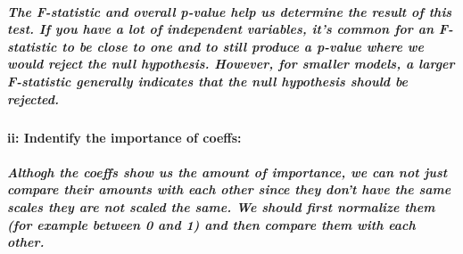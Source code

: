 \documentclass[
]{article}
\begin{document}
\hypertarget{the-f-statistic-and-overall-p-value-help-us-determine-the-result-of-this-test.-if-you-have-a-lot-of-independent-variables-its-common-for-an-f-statistic-to-be-close-to-one-and-to-still-produce-a-p-value-where-we-would-reject-the-null-hypothesis.-however-for-smaller-models-a-larger-f-statistic-generally-indicates-that-the-null-hypothesis-should-be-rejected.}{%
\subparagraph{The F-statistic and overall p-value help us determine the
result of this test. If you have a lot of independent variables, it's
common for an F-statistic to be close to one and to still produce a
p-value where we would reject the null hypothesis. However, for smaller
models, a larger F-statistic generally indicates that the null
hypothesis should be
rejected.}\label{the-f-statistic-and-overall-p-value-help-us-determine-the-result-of-this-test.-if-you-have-a-lot-of-independent-variables-its-common-for-an-f-statistic-to-be-close-to-one-and-to-still-produce-a-p-value-where-we-would-reject-the-null-hypothesis.-however-for-smaller-models-a-larger-f-statistic-generally-indicates-that-the-null-hypothesis-should-be-rejected.}}

\hypertarget{ii-indentify-the-importance-of-coeffs}{%
\paragraph{ii: Indentify the importance of
coeffs:}\label{ii-indentify-the-importance-of-coeffs}}

\hypertarget{althogh-the-coeffs-show-us-the-amount-of-importance-we-can-not-just-compare-their-amounts-with-each-other-since-they-dont-have-the-same-scales-they-are-not-scaled-the-same.-we-should-first-normalize-them-for-example-between-0-and-1-and-then-compare-them-with-each-other.}{%
\subparagraph{Althogh the coeffs show us the amount of importance, we
can not just compare their amounts with each other since they don't have
the same scales they are not scaled the same. We should first normalize
them (for example between 0 and 1) and then compare them with each
other.}\label{althogh-the-coeffs-show-us-the-amount-of-importance-we-can-not-just-compare-their-amounts-with-each-other-since-they-dont-have-the-same-scales-they-are-not-scaled-the-same.-we-should-first-normalize-them-for-example-between-0-and-1-and-then-compare-them-with-each-other.}}
\end{document}
